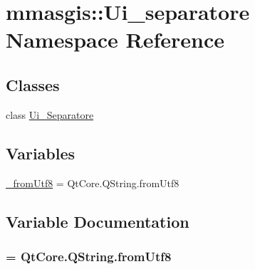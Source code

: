 \hypertarget{namespacemmasgis_1_1Ui__separatore}{
\section{mmasgis::Ui\_\-separatore Namespace Reference}
\label{namespacemmasgis_1_1Ui__separatore}
}
\subsection*{Classes}
\begin{DoxyCompactItemize}
\item 
class \hyperlink{classmmasgis_1_1Ui__separatore_1_1Ui__Separatore}{Ui\_\-Separatore}
\end{DoxyCompactItemize}
\subsection*{Variables}
\begin{DoxyCompactItemize}
\item 
\hyperlink{namespacemmasgis_1_1Ui__separatore_a1828896fd19a4be4f423c5fc0a1c2a3b}{\_\-fromUtf8} = QtCore.QString.fromUtf8
\end{DoxyCompactItemize}


\subsection{Variable Documentation}
\hypertarget{namespacemmasgis_1_1Ui__separatore_a1828896fd19a4be4f423c5fc0a1c2a3b}{
\subsubsection[{\_\-fromUtf8}]{ = QtCore.QString.fromUtf8}}
\label{namespacemmasgis_1_1Ui__separatore_a1828896fd19a4be4f423c5fc0a1c2a3b}
